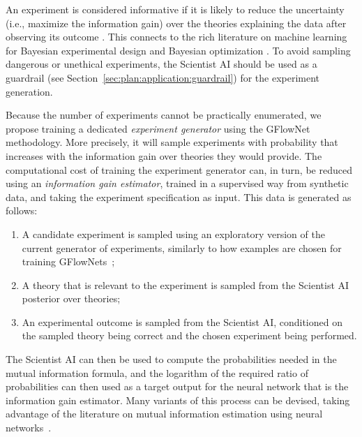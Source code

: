 An experiment is considered informative if it is likely to reduce the uncertainty (i.e., maximize the information gain) over the theories explaining the data after observing its outcome \cite{proceedings.mlr.press.v162.jain22a.html}.
This connects to the rich literature on machine learning for Bayesian experimental design and Bayesian optimization \cite{projecteuclid.org.journals.statistical.science.volume.39.issue.1.Modern.Bayesian.Experimental.Design.10.1214.23.STS915.short,bayesoptbook.com}.
To avoid sampling dangerous or unethical experiments, the Scientist AI should be used as a guardrail (see Section~\ref{sec:plan:application:guardrail}) for the experiment generation.

Because the number of experiments cannot be practically enumerated, we propose training a dedicated \textit{experiment generator} using the GFlowNet methodology. More precisely, it will sample experiments with probability that increases with the information gain over theories they would provide.
The computational cost of training the experiment generator can, in turn, be reduced using an \textit{information gain estimator}, trained in a supervised way from synthetic data, and taking the experiment specification as input. This data is generated as follows:
\begin{enumerate}
    \item A candidate experiment is sampled using an exploratory version of the current generator of experiments, similarly to how examples are chosen for training GFlowNets~\cite{openreview.net.forum.id.BdmVgLMvaf}; 
    \item A theory that is relevant to the experiment is sampled from the Scientist AI posterior over theories;
    \item An experimental outcome is sampled from the Scientist AI, conditioned on the sampled theory being correct and the chosen experiment being performed.
\end{enumerate}
The Scientist AI can then be used to compute the probabilities needed in the mutual information formula, and the logarithm of the required ratio of probabilities can then used as a target output for the neural network that is the information gain estimator. Many variants of this process can be devised, taking advantage of the literature on mutual information estimation using neural networks~\cite{belghazi2018mine,colombo2021novel,ivanova2024data,hejna2025robot,NEURIPS2023_36b80eae,pmlr-v97-poole19a,peyrard2025metastatisticallearningsupervisedlearning}.

